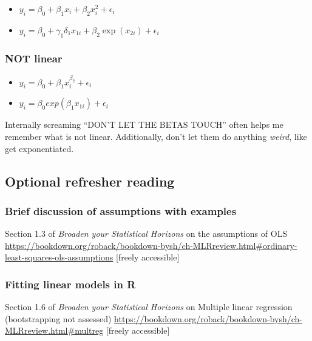 \documentclass[
  openany]{book}
\providecommand{\tightlist}{%
  \setlength{\itemsep}{0pt}\setlength{\parskip}{0pt}}
\begin{document}
\begin{itemize}
\tightlist
\item
  \(y_i = \beta_0 + \beta_1x_i + \beta_2x_i^2 + \epsilon_i\)\\
\item
  \(y_i = \beta_0 + γ_1δ_1x_{1i} + \beta_2\exp(x_{2i}) + \epsilon_i\)
\end{itemize}

\hypertarget{not-linear}{%
\subsubsection{NOT linear}\label{not-linear}}

\begin{itemize}
\tightlist
\item
  \(y_i = \beta_0 + \beta_1x_i^{\beta_2} + \epsilon_i\)\\
\item
  \(y_i = \beta_0 exp(\beta_1x_{1i}) + \epsilon_i\)
\end{itemize}

Internally screaming ``DON'T LET THE BETAS TOUCH'' often helps me remember what is not linear. Additionally, don't let them do anything \emph{weird}, like get exponentiated.

\hypertarget{optional-refresher-reading}{%
\subsection{Optional refresher reading}\label{optional-refresher-reading}}

\hypertarget{brief-discussion-of-assumptions-with-examples}{%
\subsubsection{Brief discussion of assumptions with examples}\label{brief-discussion-of-assumptions-with-examples}}

Section 1.3 of \emph{Broaden your Statistical Horizons} on the assumptions of OLS
\url{https://bookdown.org/roback/bookdown-bysh/ch-MLRreview.html\#ordinary-least-squares-ols-assumptions}
{[}freely accessible{]}

\hypertarget{fitting-linear-models-in-r}{%
\subsubsection{Fitting linear models in R}\label{fitting-linear-models-in-r}}

Section 1.6 of \emph{Broaden your Statistical Horizons} on Multiple linear regression (bootstrapping not assessed) \url{https://bookdown.org/roback/bookdown-bysh/ch-MLRreview.html\#multreg} {[}freely accessible{]}
\end{document}
